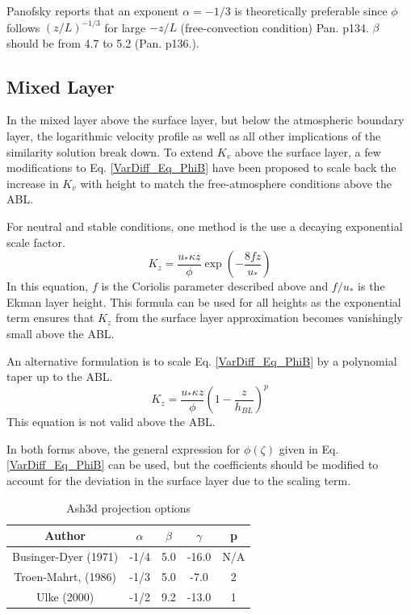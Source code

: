 Panofsky reports that an exponent $\alpha=-1/3$ is theoretically preferable
since $\phi$ follows $(z/L)^{-1/3}$ for large $-z/L$ (free-convection condition) Pan. p134.
$\beta$ should be from 4.7 to 5.2 (Pan. p136.).

\subsection{Mixed Layer}
In the mixed layer above the surface layer, but below the atmospheric boundary layer,
the logarithmic velocity profile as well as all other implications of the similarity
solution break down. To extend $K_v$ above the surface layer, a few modifications to
Eq. \ref{VarDiff_Eq_PhiB} have been proposed to scale back the increase in $K_v$ with
height to match the free-atmosphere conditions above the ABL.

For neutral and stable conditions, one method is the use a decaying exponential scale
factor.
\begin{equation}\label{VarDiff_Eq_Kz_Mixed_Exp}
K_z = \frac{u_{*} \kappa z}{\phi} \exp \left( -\frac{8 f z}{u_*} \right)
\end{equation}
In this equation, $f$ is the Coriolis parameter described above and $f/u_*$ is
the Ekman layer height. This formula can be used for all heights as the exponential
term ensures that $K_z$ from the surface layer approximation becomes vanishingly
small above the ABL.

An alternative formulation is to scale Eq. \ref{VarDiff_Eq_PhiB} by a polynomial taper
up to the ABL.
\begin{equation}\label{VarDiff_Eq_Kz_Mixed_Poly}
K_z = \frac{u_{*} \kappa z}{\phi} \left( 1-\frac{z}{h_{BL}} \right)^p
\end{equation}
This equation is not valid above the ABL.

In both forms above, the general expression for $\phi(\zeta)$ given in Eq. \ref{VarDiff_Eq_PhiB}
can be used, but the coefficients should be modified to account for the deviation in the
surface layer due to the scaling term.

\small
\begin{table}[htbp]
\begin{center}
\begin{tabular}{| c | c | c | c | c |}
\hline
Author & $\alpha$ & $\beta$ & $\gamma$ & p \\
\hline
Businger-Dyer (1971)     & -1/4 & 5.0 & -16.0 & N/A \\
Troen-Mahrt, (1986)      & -1/3 & 5.0 & -7.0  & 2 \\
Ulke (2000)              & -1/2 & 9.2 & -13.0 & 1 \\
\hline
\end{tabular}
\caption{\label{tab:ProjOpt}Ash3d projection options}
\end{center}
\end{table}
\normalsize



